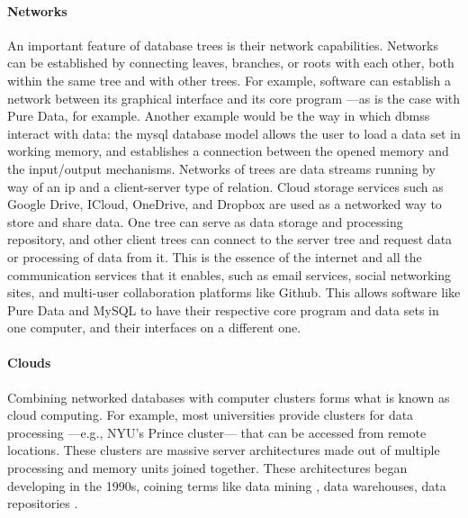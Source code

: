 \paragraph{Networks}
An important feature of database trees is their network capabilities. Networks can be established by connecting leaves, branches, or roots with each other, both within the same tree and with other trees. For example, software can establish a network between its graphical interface and its core program ---as is the case with Pure Data, for example. Another example would be the way in which \gls{dbms}s interact with data: the \gls{mysql} database model allows the user to load a data set in working memory, and establishes a connection between the opened memory and the input/output mechanisms. Networks of trees are data streams running by way of an \gls{ip} and a client-server type of relation. Cloud storage services such as Google Drive, ICloud, OneDrive, and Dropbox are used as a networked way to store and share data. One tree can serve as data storage and processing repository, and other client trees can connect to the server tree and request data or processing of data from it. This is the essence of the internet and all the communication services that it enables, such as email services, social networking sites, and multi-user collaboration platforms like Github. This allows software like Pure Data and MySQL to have their respective core program and data sets in one computer, and their interfaces on a different one.

\paragraph{Clouds}
Combining networked databases with computer clusters forms what is known as cloud computing. For example, most universities provide clusters for data processing ---e.g., NYU's Prince cluster--- that can be accessed from remote locations. These clusters are massive server architectures made out of multiple processing and memory units joined together. These architectures began developing in the 1990s, coining terms like data mining \parencite{DBLP:journals/corr/abs-1109-1145}, data warehouses, data repositories \parencite{ilprints81}.
